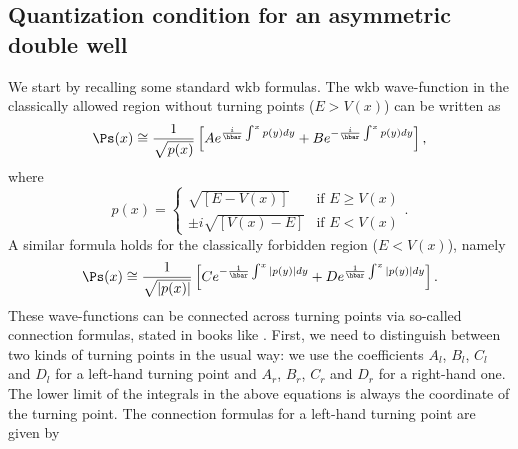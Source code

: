 \documentclass[12pt]{article}
\begin{document}
\subsection{Quantization condition for an asymmetric double well}
 We start by recalling some standard {\sc wkb} formulas. 
The {\sc wkb} wave-function in the classically allowed region without turning points ($E>V(x)$) can be written as
\begin{equation}
\Ps(x)\cong\frac{1}{\sqrt{p(x)}}\left[Ae^{\frac{i}{\hbar}\int^{x}{p(y)dy}}+Be^{-\frac{i}{\hbar}\int^{x}{p(y)dy}}\right],
\label{WKBclassical}
\end{equation}
where
\begin{equation}
p(x)=\left\{\begin{array}{ll}
\sqrt{\left[E-V(x)\right]} & \mbox{if } E\geq V(x)\\
\pm i\sqrt{\left[V(x)-E\right]} & \mbox{if } E< V(x)
\end{array}\right. .
\label{p}
\end{equation}
 A similar formula holds for the classically forbidden region ($E<V(x)$), namely
\begin{equation}
\Ps(x)\cong\frac{1}{\sqrt{|p(x)|}}\left[Ce^{-\frac{1}{\hbar}\int^{x}{|p(y)|dy}}+De^{\frac{1}{\hbar}\int^{x}{|p(y)|dy}}\right].
\label{WKBforbidden}
\end{equation}
 These wave-functions can be connected across turning points via so-called connection formulas, stated in books like \cite{Griffiths}.
First, we need to distinguish between two kinds of turning points in the usual way: we use the coefficients $A_l$, $B_l$, $C_l$ and $D_l$ for a left-hand turning point and $A_r$, $B_r$, $C_r$ and $D_r$ for a right-hand one. 
The lower limit of the integrals in the above equations is always the coordinate of the turning point.
The connection formulas for a left-hand turning point are given by
\end{document}
